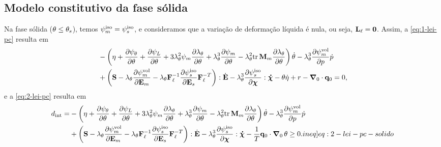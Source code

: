 \documentclass[Tese.tex]{subfiles}
\begin{document}
\subsection{Modelo constitutivo da fase sólida}\label{sec:solido}

Na fase sólida ($\theta \leq \theta_s$), temos $\psi_m^\text{iso} = \psi_s^\text{iso}$, e consideramos que a variação de deformação líquida é nula, ou seja, $\mathbf{L}_\ell = \mathbf{0}$. Assim, a \cref{eq:1-lei-pc} resulta em
\begin{equation}
\begin{aligned}
&-\left(\eta+\dfrac{\partial\psi_{\theta}}{\partial\theta} + \dfrac{\partial\psi_L}{\partial\theta} + 3\lambda_{\theta}^2\psi_m\dfrac{\partial\lambda_{\theta}}{\partial\theta} + \lambda_{\theta}^3\dfrac{\partial\psi_m}{\partial\theta} - \lambda_{\theta}^2\text{tr}\,\mathbf{M}_m\dfrac{\partial\lambda_{\theta}}{\partial\theta}\right)\dot{\theta} - \lambda_{\theta}^3\dfrac{\partial\psi_m^\text{vol}}{\partial p}\dot{p}\\
&+\left(\mathbf{S} - \lambda_{\theta}\dfrac{\partial\psi_m^\text{vol}}{\partial\mathbf{E}_m} - \lambda_{\theta}\mathbf{F}_\ell^{-1}\dfrac{\partial\psi_s^\text{iso}}{\partial\mathbf{E}_s}\mathbf{F}_\ell^{-T}\right):\dot{\mathbf{E}} - \lambda_{\theta}^3\dfrac{\partial\psi_s^\text{iso}}{\partial\boldsymbol{\chi}}:\boldsymbol{\dot{\chi}} -\theta \dot{\eta} + r - \boldsymbol{\nabla}_0\cdot\mathbf{q}_0 = 0, \label{eq:1-lei-pc-solido}
\end{aligned}
\end{equation}
e a \cref{eq:2-lei-pc} resulta em
\begin{equation}
\begin{aligned}
\dissipation = &-\left(\entropy+\dfrac{\partial\helmholtzt}{\partial\temp} + \dfrac{\partial\helmholtzL}{\partial\temp} + 3\alongTermico^2\helmholtzm\dfrac{\partial\alongTermico}{\partial\temp} + \alongTermico^3\dfrac{\partial\helmholtzm}{\partial\temp} - \alongTermico^2\tr\mandelm\dfrac{\partial\alongTermico}{\partial\temp}\right)\dottemp - \alongTermico^3\dfrac{\partial\helmholtzmvol}{\partial\p}\dotp\\
&+\left(\S - \alongTermico\dfrac{\partial\helmholtzmvol}{\partial\Em} - \alongTermico\Fl^{-1}\dfrac{\partial\helmholtzs}{\partial\Es}\Fl^{-T}\right):\dotE - \alongTermico^3\dfrac{\partial\helmholtzs}{\partial\internalVariables}:\dotInternalVariables - \dfrac{1}{T}\qi\cdot\gradientei\,\temp \geq 0. \label[ineq]{eq:2-lei-pc-solido}
\end{aligned}
\end{equation}
\end{document}
